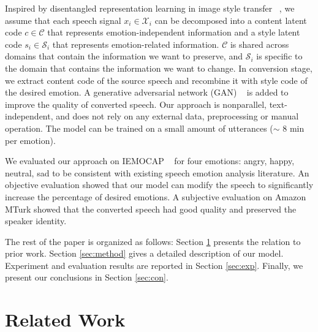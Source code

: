 \documentclass{article}
\begin{document}
Inspired by disentangled representation learning in image style transfer ~\cite{gatys2016image}, we assume that each speech signal $x_i \in \mathcal{X}_i$ can be decomposed into a content latent code $c \in \mathcal{C}$ that represents emotion-independent information and a style latent code $s_i \in \mathcal{S}_i$ that represents emotion-related information. $\mathcal{C}$ is shared across domains that contain the information we want to preserve, and $\mathcal{S}_i$ is specific to the domain that contains the information we want to change. In conversion stage, we extract content code of the source speech and recombine it with style code of the desired emotion. A generative adversarial network (GAN) ~\cite{goodfellow2014generative} is added to improve the quality of converted speech. Our approach is nonparallel, text-independent, and does not rely on any external data, preprocessing or manual operation. The model can be trained on a small amount of utterances ($\sim$ 8 min per emotion).


We evaluated our approach on IEMOCAP ~\cite{busso2008iemocap} for four emotions: angry, happy, neutral, sad {\color{blue} to be consistent with existing speech emotion analysis literature}.
An objective evaluation showed that our model can modify the speech to significantly increase the percentage of desired emotions. A subjective evaluation on Amazon MTurk showed that the converted speech had good quality and preserved the speaker identity.

The rest of the paper is organized as follows: Section \ref{sec:related} presents the relation to prior work. Section \ref{sec:method} gives a detailed description of our model. Experiment and evaluation results are reported in Section \ref{sec:exp}. Finally, we present our conclusions in Section \ref{sec:con}.


\section{Related Work}
\label{sec:related}
\end{document}
